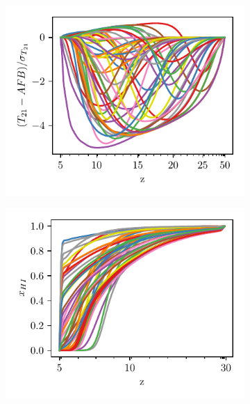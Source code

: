 \begin{figure}
    \centering
    \begin{subfigure}{0.5\textwidth}
        
    \includegraphics{globalemu/figs/preprocessed_signals.pdf}
    \end{subfigure}%
    \begin{subfigure}{0.5\textwidth}
    \includegraphics{globalemu/figs/xHI_preprocessed_signals.pdf}
    \end{subfigure}

\end{figure}
